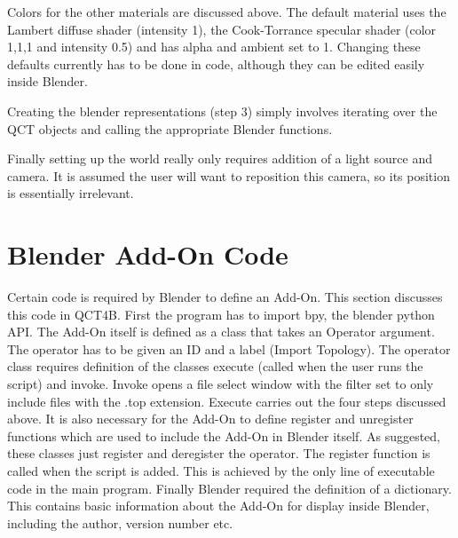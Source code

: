 \documentclass{report}
\begin{document}
Colors for the other materials are discussed above. The default material uses the Lambert diffuse shader (intensity 1), 
the Cook-Torrance specular shader (color 1,1,1 and intensity 0.5) and has alpha and ambient set to 1.
Changing these defaults currently has to be done in code, although they can be edited easily inside Blender.

Creating the blender representations (step 3) simply involves iterating over the QCT objects and calling the appropriate Blender functions.

Finally setting up the world really only requires addition of a light source and camera.
It is assumed the user will want to reposition this camera, so its position is essentially irrelevant.

\section{Blender Add-On Code}

Certain code is required by Blender to define an Add-On. This section discusses this code in QCT4B.
First the program has to import bpy, the blender python API.
The Add-On itself is defined as a class that takes an Operator argument.
The operator has to be given an ID 
 and a label (Import Topology).
The operator class requires definition of the classes execute (called when the user runs the script)
and invoke.
Invoke opens a file select window with the filter set to only include files with the .top extension.
Execute carries out the four steps discussed above.
It is also necessary for the Add-On to define register and unregister functions which are used to include the Add-On in Blender itself.
As suggested, these classes just register and deregister the operator. The register function is called when the script is added.
This is achieved by the only line of executable code in the main program.
Finally Blender required the definition of a dictionary. %
This contains basic information about the Add-On for display inside Blender, including the author, version number etc.
\end{document}
